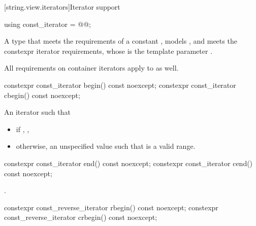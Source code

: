 [string.view.iterators]{Iterator support}

%
\begin{itemdecl}
using const_iterator = @@;
\end{itemdecl}

\begin{itemdescr}
\pnum
A type that meets the requirements
of a constant
,
models , and
meets the constexpr iterator requirements,
whose  is the template parameter .

\pnum
All requirements on container iterators
apply to  as well.
\end{itemdescr}

%
%
\begin{itemdecl}
constexpr const_iterator begin() const noexcept;
constexpr const_iterator cbegin() const noexcept;
\end{itemdecl}

\begin{itemdescr}
\pnum
\returns
An iterator such that
\begin{itemize}
\item if , ,
\item otherwise, an unspecified value such that  is a valid range.
\end{itemize}
\end{itemdescr}

%
%
\begin{itemdecl}
constexpr const_iterator end() const noexcept;
constexpr const_iterator cend() const noexcept;
\end{itemdecl}

\begin{itemdescr}
\pnum
\returns
{}.
\end{itemdescr}

%
%
\begin{itemdecl}
constexpr const_reverse_iterator rbegin() const noexcept;
constexpr const_reverse_iterator crbegin() const noexcept;
\end{itemdecl}

